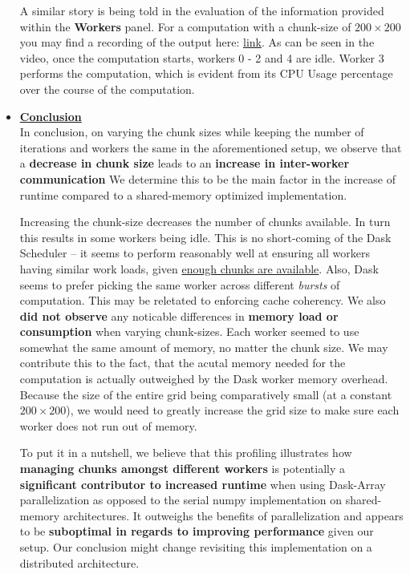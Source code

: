 \documentclass[a4paper,12pt]{article}
\begin{document}
\begin{itemize}
A similar story is being told in the evaluation of the information provided within the \textbf{Workers} panel.
For a computation with a chunk-size of $200 \times 200$ you may find a recording of the output here: \href{https://github.com/paulmyr/DD2358-HPC25/tree/master/04_parallel/bonus#chunk-size-200}{link}.
As can be seen in the video, once the computation starts, workers 0 - 2 and 4 are idle.
Worker 3 performs the computation, which is evident from its CPU Usage percentage over the course of the computation.

\item \textbf{\underline{Conclusion}}\\
  In conclusion, on varying the chunk sizes while keeping the number of iterations and workers the same in the aforementioned setup, we observe that a \textbf{decrease in chunk size} leads to an \textbf{increase in inter-worker communication}
  We determine this to be the main factor in the increase of runtime compared to a shared-memory optimized implementation.

  Increasing the chunk-size decreases the number of chunks available.
  In turn this results in some workers being idle.
  This is no short-coming of the Dask Scheduler -- it seems to perform reasonably well at ensuring all workers having similar work loads, given \underline{enough chunks are available}.
  Also, Dask seems to prefer picking the same worker across different \textit{bursts} of computation.
  This may be reletated to enforcing cache coherency.
  We also \textbf{did not observe} any noticable differences in \textbf{memory load or consumption} when varying chunk-sizes.
  Each worker seemed to use somewhat the same amount of memory, no matter the chunk size.
  We may contribute this to the fact, that the acutal memory needed for the computation is actually outweighed by the Dask worker memory overhead.
  Because the size of the entire grid being comparatively small (at a constant $200 \times 200$), we would need to greatly increase the grid size to make sure each worker does not run out of memory.

  To put it in a nutshell, we believe that this profiling illustrates how \textbf{managing chunks amongst different workers} is potentially a \textbf{significant contributor to increased runtime} when using Dask-Array parallelization as opposed to the serial numpy implementation on shared-memory architectures.
  It outweighs the benefits of parallelization and appears to be \textbf{suboptimal in regards to improving performance} given our setup.
  Our conclusion might change revisiting this implementation on a distributed architecture. 
\end{itemize}
\end{document}
